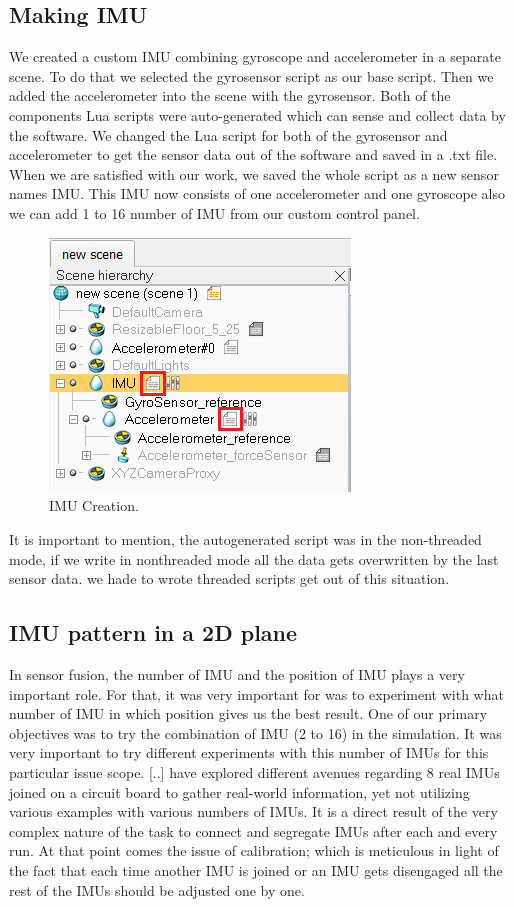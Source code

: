 \subsection{Making IMU}

We created a custom IMU combining gyroscope and accelerometer in a separate scene. To do that we selected the gyrosensor script as our base script. Then we added the accelerometer into the scene with the gyrosensor. Both of the components Lua scripts were auto-generated which can sense and collect data by the software. We changed the Lua script for both of the gyrosensor and accelerometer to get the sensor data out of the software and saved in a .txt file. When we are satisfied with our work, we saved the whole script as a new sensor names IMU. This IMU now consists of one accelerometer and one gyroscope also we can add 1  to 16 number of IMU from our custom control panel.

\begin{figure}[h]
  \centering
    \includegraphics[width=8cm]{figures/IMU_Creation.png}
    \caption{IMU Creation.}
\end{figure}

It is important to mention, the autogenerated script was in the non-threaded mode, if we write in nonthreaded mode all the data gets overwritten by the last sensor data. we hade to wrote threaded scripts get out of this situation.

\subsection{IMU pattern in a 2D plane}

In sensor fusion, the number of IMU and the position of IMU plays a very important role. For that, it was very important for was to experiment with what number of IMU in which position gives us the best result. One of our primary objectives was to try the combination of IMU (2 to 16) in the simulation. 
It was very important to try different experiments with this number of IMUs for this particular issue scope. 
[..] have explored different avenues regarding 8 real IMUs joined on a circuit board to gather real-world information, yet not utilizing various examples with various numbers of IMUs. It is a direct result of the very complex nature of the task to connect and segregate IMUs after each and every run. At that point comes the issue of calibration; which is meticulous in light of the fact that each time another IMU is joined or an IMU gets disengaged all the rest of the IMUs should be adjusted one by one.


